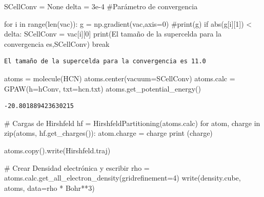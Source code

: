 \documentclass[
  letterpaper,
  DIV=11,
  numbers=noendperiod]{scrreprt}
\newenvironment{Shaded}{\begin{snugshade}}{\end{snugshade}}
\newcommand{\BuiltInTok}[1]{\textcolor[rgb]{0.00,0.23,0.31}{#1}}
\newcommand{\CommentTok}[1]{\textcolor[rgb]{0.37,0.37,0.37}{#1}}
\newcommand{\ControlFlowTok}[1]{\textcolor[rgb]{0.00,0.23,0.31}{#1}}
\newcommand{\DecValTok}[1]{\textcolor[rgb]{0.68,0.00,0.00}{#1}}
\newcommand{\FloatTok}[1]{\textcolor[rgb]{0.68,0.00,0.00}{#1}}
\newcommand{\KeywordTok}[1]{\textcolor[rgb]{0.00,0.23,0.31}{#1}}
\newcommand{\NormalTok}[1]{\textcolor[rgb]{0.00,0.23,0.31}{#1}}
\newcommand{\OperatorTok}[1]{\textcolor[rgb]{0.37,0.37,0.37}{#1}}
\newcommand{\StringTok}[1]{\textcolor[rgb]{0.13,0.47,0.30}{#1}}
\newcommand{\VariableTok}[1]{\textcolor[rgb]{0.07,0.07,0.07}{#1}}
\begin{document}
\begin{Shaded}
\begin{Highlighting}[]
\NormalTok{SCellConv }\OperatorTok{=} \VariableTok{None}
\NormalTok{delta }\OperatorTok{=} \FloatTok{3e{-}4} \CommentTok{\#Parámetro de convergencia}

\ControlFlowTok{for}\NormalTok{ i }\KeywordTok{in} \BuiltInTok{range}\NormalTok{(}\BuiltInTok{len}\NormalTok{(vac)):}
\NormalTok{  g }\OperatorTok{=}\NormalTok{ np.gradient(vac,axis}\OperatorTok{=}\DecValTok{0}\NormalTok{)}
  \CommentTok{\#print(g)}
  \ControlFlowTok{if} \BuiltInTok{abs}\NormalTok{(g[i][}\DecValTok{1}\NormalTok{]) }\OperatorTok{\textless{}}\NormalTok{ delta:}
\NormalTok{    SCellConv }\OperatorTok{=}\NormalTok{ vac[i][}\DecValTok{0}\NormalTok{]}
    \BuiltInTok{print}\NormalTok{(}\StringTok{\textquotesingle{}El tamaño de la supercelda para la convergencia es\textquotesingle{}}\NormalTok{,SCellConv)}
    \ControlFlowTok{break}
\end{Highlighting}
\end{Shaded}

\begin{verbatim}
El tamaño de la supercelda para la convergencia es 11.0
\end{verbatim}

\begin{Shaded}
\begin{Highlighting}[]
\NormalTok{atoms }\OperatorTok{=}\NormalTok{ molecule(}\StringTok{\textquotesingle{}HCN\textquotesingle{}}\NormalTok{)}
\NormalTok{atoms.center(vacuum}\OperatorTok{=}\NormalTok{SCellConv)}
\NormalTok{atoms.calc }\OperatorTok{=}\NormalTok{ GPAW(h}\OperatorTok{=}\NormalTok{hConv, txt}\OperatorTok{=}\StringTok{\textquotesingle{}hcn.txt\textquotesingle{}}\NormalTok{)}
\NormalTok{atoms.get\_potential\_energy()}
\end{Highlighting}
\end{Shaded}

\begin{verbatim}
-20.801889423630215
\end{verbatim}

\begin{Shaded}
\begin{Highlighting}[]
\CommentTok{\# Cargas de Hirshfeld}
\NormalTok{hf }\OperatorTok{=}\NormalTok{ HirshfeldPartitioning(atoms.calc)}
\ControlFlowTok{for}\NormalTok{ atom, charge }\KeywordTok{in} \BuiltInTok{zip}\NormalTok{(atoms, hf.get\_charges()):}
\NormalTok{    atom.charge }\OperatorTok{=}\NormalTok{ charge}
    \BuiltInTok{print}\NormalTok{ (charge)}

\NormalTok{atoms.copy().write(}\StringTok{\textquotesingle{}Hirshfeld.traj\textquotesingle{}}\NormalTok{)}

\CommentTok{\# Crear Densidad electrónica y escribir}
\NormalTok{rho }\OperatorTok{=}\NormalTok{ atoms.calc.get\_all\_electron\_density(gridrefinement}\OperatorTok{=}\DecValTok{4}\NormalTok{)}
\NormalTok{write(}\StringTok{\textquotesingle{}density.cube\textquotesingle{}}\NormalTok{, atoms, data}\OperatorTok{=}\NormalTok{rho }\OperatorTok{*}\NormalTok{ Bohr}\OperatorTok{**}\DecValTok{3}\NormalTok{)}
\end{Highlighting}
\end{Shaded}
\end{document}
